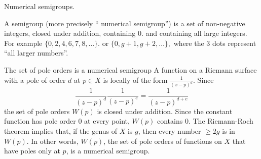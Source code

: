 \documentclass[12pt, aspectratio=169]{beamer}
\begin{document}
\begin{frame}{Numerical semigroups.}
 
 A \alert{semigroup} (more precisely `` numerical semigroup'') is a set of  non-negative integers, 
  \alert{closed under addition}, \alert{containing 0}. and containing all large integers.  For
 example 
 $
\{0,2, 4, 6, 7, 8,\dots\}.
 $
or 
$
 \{0,g+1,g+2,\dots\},
 $
where the 3 dots represent ``all larger numbers''.
\bigskip
\end{frame}


\begin{frame}{The set of pole orders is a numerical semigroup}
A function on a Riemann surface with a pole of order $d$ at $p\in X$ is locally of the form
$
\frac{1}{(x-p)^d} .
$
Since 
$$
\frac{1}{(z-p)^d}\frac{1}{(z-p)^e} = \frac{1}{(z-p)^{d+e}}
$$
 the set of pole orders $W(p)$ is \alert{closed under addition}.  Since the constant function has pole order 0 at every point, $W(p)$ \alert{contains 0}. The Riemann-Roch theorem implies that, if the genus of $X$ is $g$, then
  \alert{every number $\geq 2g$ is in $W(p)$}.
 \medskip
 In other words, $W(p)$, the set of pole orders of functions on $X$ that have poles only at $p$, is a \alert{numerical semigroup}.
 
\end{frame}
\end{document}

